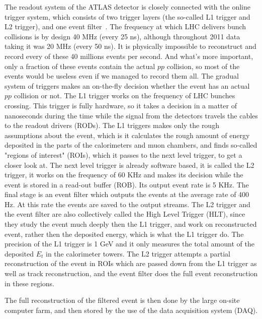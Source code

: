 The readout system of the ATLAS detector is closely connected with the online trigger system, which consists of two trigger layers (the so-called L1 trigger and L2 trigger), and one event filter~\cite{lib:trigger}. The frequency at which LHC delivers bunch collisions is by design 40 MHz (every 25 ns), although throughout 2011 data taking it was 20 MHz (every 50 ns). It is physically impossible to reconstruct and record every of these 40 millions events per second. And what's more important, only a fraction of these events contain the actual $pp$ collision, so most of the events would be useless even if we managed to record them all. The gradual system of triggers makes an on-the-fly decision whether the event has an actual $pp$ collision or not. The L1 trigger works on the frequency of LHC bunches crossing. This trigger is fully hardware, so it takes a decision in a matter of nanoseconds during the time while the signal from the detectors travels the cables to the readout drivers (RODs). The L1 triggers makes only the rough assumptions about the event, which is it calculates the rough amount of energy deposited in the parts of the calorimeters and muon chambers, and finds so-called "regions of interest" (ROIs), which it passes to the next level trigger, to get a closer look at. The next level trigger is already software based, it is called the L2 trigger, it works on the frequency of 60 KHz and makes its decision while the event is stored in a read-out buffer (ROB). Its output event rate is 5 KHz. The final stage is an event filter which outputs the events at the average rate of 400 Hz. At this rate the events are saved to the output streams. The L2 trigger and the event filter are also collectively called the High Level Trigger (HLT), since they study the event much deeply then the L1 trigger, and work on reconstructed event, rather then the deposited energy, which is what the L1 trigger do. The precision of the L1 trigger is 1 GeV and it only measures the total amount of the deposited $E_{t}$ in the calorimeter towers. The L2 trigger attempts a partial reconstruction of the event in ROIs which are passed down from the L1 trigger as well as track reconstruction, and the event filter does the full event reconstruction in these regions.

The full reconstruction of the filtered event is then done by the large on-site computer farm, and then stored by the use of the data acquisition system (DAQ).
